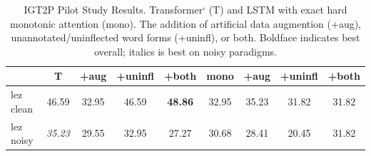 \begin{table}[t]
\centering
    \begin{tabular}{l|cccc|cccc}
    \toprule
      \textbf{} & \textbf{T} & \textbf{+aug} & \textbf{+uninfl} & \textbf{+both} & \textbf{mono} &  \textbf{+aug} &
      \textbf{+uninfl} &
      \textbf{+both} \\
      \hline
      lez clean & 46.59 & 32.95 & 46.59 & \textbf{48.86} & 32.95 & 35.23 & 31.82 & 31.82 \\
      lez noisy & \textit{35.23} & 29.55 & 32.95 & 27.27 & 30.68 & 28.41 & 20.45 & 31.82 \\
    \end{tabular}
    \caption[IGT2P Pilot Study Results]{IGT2P Pilot Study Results. Transformer` (T) and LSTM with exact hard monotonic attention (mono). The addition of artificial data augmention (+aug), unannotated/uninflected word forms (+uninfl), or both. Boldface indicates best overall; italics is best on noisy paradigms.}
    \label{tab:IGT2Presults}
\end{table}
 
